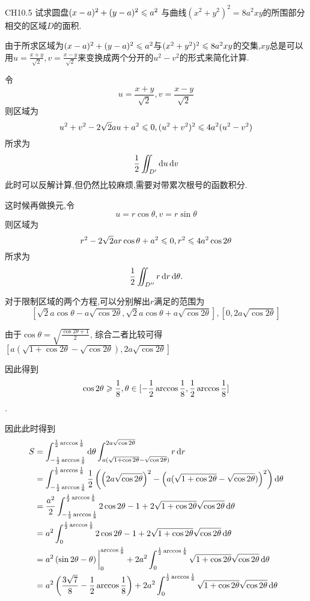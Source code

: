\begin{exercise}{CH10.5}
    试求圆盘$(x-a)^2+(y-a)^2\leqslant a^2$ 与曲线$(x^2+y^2)^2=8a^2xy$的所围部分相交的区域$D$的面积.
    \end{exercise}
    \begin{solution}
        由于所求区域为$(x-a)^2+(y-a)^2\leqslant a^2$与$(x^2+y^2)^2\leqslant 8a^2xy$的交集,$xy$总是可以用$u=\frac{x+y}{\sqrt{2}},v=\frac{x-y}{\sqrt{2}}$来变换成两个分开的$u^2-v^2$的形式来简化计算.
    
        令$$u=\frac{x+y}{\sqrt{2}},v=\frac{x-y}{\sqrt{2}}$$则区域为$$u^2+v^2-2\sqrt{2}au+a^2\leqslant 0,(u^2+v^2)^2\leqslant4a^2(u^2-v^2)$$所求为$$\frac{1}{2}\iint_{D'}\operatorname{d\!} u \operatorname{d\!} v$$
        此时可以反解计算,但仍然比较麻烦,需要对带累次根号的函数积分.
    
        这时候再做换元,令$$u=r\cos\theta,v=r\sin\theta$$则区域为$$r^2-2\sqrt{2}ar\cos\theta+a^2\leqslant 0,r^2\leqslant4a^2\cos 2\theta$$所求为$$\frac{1}{2}\iint_{D''}r\operatorname{d\!} r \operatorname{d\!} \theta.$$
    
        对于限制区域的两个方程,可以分别解出$r$满足的范围为$$[\sqrt{2}a\cos\theta-a\sqrt{\cos2\theta},\sqrt{2}a\cos\theta+a\sqrt{\cos2\theta}],[0,2a\sqrt{\cos2\theta}]$$
    
        由于$\cos\theta=\sqrt{\frac{\cos2\theta+1}{2}}$,
        综合二者比较可得$[a(\sqrt{1+\cos2\theta}-\sqrt{\cos2\theta}),2a\sqrt{\cos2\theta}]$
    
        因此得到$$\cos2\theta\geqslant\frac{1}{8},\theta\in[-\frac{1}{2}\arccos\frac{1}{8},\frac{1}{2}\arccos\frac{1}{8}]$$.
    
        因此此时得到\begin{align*}
            S&=\int_{-\frac{1}{2}\arccos\frac{1}{8}}^{\frac{1}{2}\arccos\frac{1}{8}}\operatorname{d\!} \theta \int_{a(\sqrt{1+\cos2\theta}-\sqrt{\cos2\theta})}^{2a\sqrt{\cos2\theta}}r\operatorname{d\!} r\\
            &=\int_{-\frac{1}{2}\arccos\frac{1}{8}}^{\frac{1}{2}\arccos\frac{1}{8}}\frac{1}{2}\left(\left(2a\sqrt{\cos2\theta}\right)^2-\left(a(\sqrt{1+\cos2\theta}-\sqrt{\cos2\theta})\right)^2\right)\operatorname{d\!} \theta \\
            &=\frac{a^2}{2}\int_{-\frac{1}{2}\arccos\frac{1}{8}}^{\frac{1}{2}\arccos\frac{1}{8}}2\cos2\theta -1+2\sqrt{1+\cos2\theta}\sqrt{\cos2\theta}\operatorname{d\!} \theta \\
            &=a^2\int_{0}^{\frac{1}{2}\arccos\frac{1}{8}}2\cos2\theta -1+2\sqrt{1+\cos2\theta}\sqrt{\cos2\theta}\operatorname{d\!} \theta \\
            &=a^2\left(\sin2\theta-\theta\right)\bigg|_0^{\arccos\frac{1}{8}}+2a^2\int_{0}^{\frac{1}{2}\arccos\frac{1}{8}}\sqrt{1+\cos2\theta}\sqrt{\cos2\theta}\operatorname{d\!} \theta \\
            &=a^2\left(\frac{3\sqrt{7}}{8}-\frac{1}{2}\arccos\frac{1}{8}\right)+2a^2\int_{0}^{\frac{1}{2}\arccos\frac{1}{8}}\sqrt{1+\cos2\theta}\sqrt{\cos2\theta}\operatorname{d\!} \theta 
        \end{align*}
    

\end{solution}
